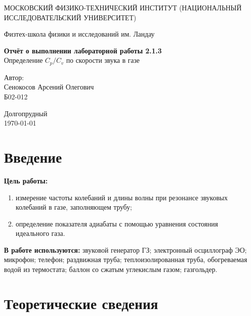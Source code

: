 \documentclass[a4paper,12pt]{article} %
\date{\today}
\begin{document}
\begin{titlepage}
	\begin{center}
		{\large МОСКОВСКИЙ ФИЗИКО-ТЕХНИЧЕСКИЙ ИНСТИТУТ (НАЦИОНАЛЬНЫЙ ИССЛЕДОВАТЕЛЬСКИЙ УНИВЕРСИТЕТ)}
	\end{center}
	\begin{center}
		{\large Физтех-школа физики и исследований им. Ландау}
	\end{center}
	
	
	\vspace{4.5cm}
	{\huge
		\begin{center}
			{\bf Отчёт о выполнении лабораторной работы 2.1.3}\\
			Определение $ C_p/C_v $ по скорости звука в газе
		\end{center}
	}
	\vspace{2cm}
	\begin{flushright}
		{\LARGE Автор:\\ Сенокосов Арсений Олегович \\
			\vspace{0.2cm}
			Б02-012}
	\end{flushright}
	\vspace{8cm}
	\begin{center}
		Долгопрудный\\
		\today
	\end{center}
\end{titlepage}


\section{Введение}
\textbf{Цель работы:}  \begin{enumerate}
\item измерение частоты колебаний и длины волны при резонансе звуковых колебаний в газе, заполняющем трубу;
\item определение показателя адиабаты с помощью уравнения состояния идеального газа.
\end{enumerate}

\textbf{В работе используются:} звуковой генератор ГЗ; электронный осциллограф ЭО; микрофон; телефон; раздвижная труба; теплоизолированная труба, обогреваемая водой из термостата; баллон со сжатым углекислым газом; газгольдер.

\section{Теоретические сведения}
\end{document}
